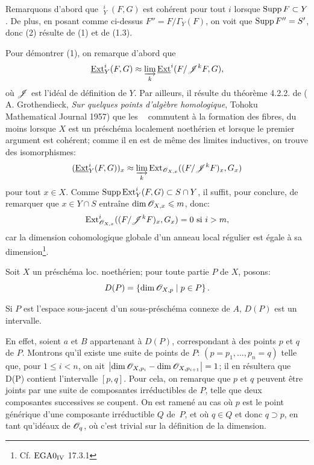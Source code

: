 Remarquons d'abord que $\mathop{\underline{\mathrm{Ext}}}\nolimits^i_Y (F, G)$ est coh\'erent pour tout $i$ lorsque $\operatorname{Supp} F \subset Y$. De plus, en posant comme ci-dessus $F'' = F/\Gamma_Y(F)$, on voit que $\operatorname{Supp} F'' = S'$, donc (2) r\'esulte de (1) et de (1.3).

Pour d\'emontrer (1), on remarque d'abord que
\[
\mathop{\underline{\mathrm{Ext}}}\nolimits^i_Y (F, G) \approx \varinjlim_{k} \mathop{\underline{\mathrm{Ext}}}\nolimits^i (F/{\mathscr J}^k F, G),
\]
o\`u ${\mathscr J}$ est l'id\'eal de d\'efinition de $Y$. Par ailleurs, il
r\'esulte du th\'eor\`eme 4.2.2. de ( A. Grothendieck,
\textit{Sur quelques points d'algèbre homologique}, Tohoku
Mathematical Journal 1957) que les $\mathop{\underline{\mathrm{Ext}}}\nolimits$ commutent \`a
la formation des fibres, du moins lorsque $X$ est un pr\'esch\'ema
localement noeth\'erien et lorsque le premier argument est coh\'erent;
comme il en est de m\^eme des limites inductives, on trouve des
isomorphismes:
\[
(\mathop{\underline{\mathrm{Ext}}}\nolimits^i_Y (F, G))_x \approx \varinjlim_{k} \operatorname{Ext}_{{\mathscr O}_{X, x}} ((F/{\mathscr J}^k F)_x, G_x)
\]
pour tout $x \in X$. Comme $\operatorname{Supp} \operatorname{Ext}^i_Y (F, G) \subset S \cap Y$, il suffit, pour conclure, de remarquer que $x \in Y \cap S$ entra\^ine $\dim {\mathscr O}_{X, x} \leqslant m$, donc:
\[
\operatorname{Ext}^i_{{\mathscr O}_{X, x}} ((F/{\mathscr J}^k F)_x, G_x) = 0 \text { si } i > m,
\]
car la dimension cohomologique globale d'un anneau local r\'egulier est \'egale \`a sa dimension\footnote{Cf. $\textup{EGA}\space 0_{\textup{IV}}$ 17.3.1}.

Soit $X$ un pr\'esch\'ema loc. noeth\'erien; pour toute partie $P$ de $X$, posons:
\[
D(P) = \left\{ \dim {\mathscr O}_{X, p} \mid p \in P \right\}.
\]

\begin{lemme}\label{VII.2.2}
Si $P$ est l'espace sous-jacent d'un sous-pr\'esch\'ema connexe de $A$, $D(P)$ est un intervalle.
\end{lemme}

En effet, soient $a$ et $B$ appartenant \`a $D(P)$, correspondant \`a des points $p$ et $q$ de $P$. Montrons qu'il existe une suite de points de $P$: $(p = p_1, \dots, p_n = q)$ telle que, pour $1 \leq i < n $, on ait $\left| \dim {\mathscr O}_{X, p_i} - \dim {\mathscr O}_{X, p_{i+1}} \right| = 1$; il en r\'esultera que D(P) contient l'intervalle $[p, q]$. Pour cela, on remarque que $p$ et $q$ peuvent \^etre joints par une suite de composantes irr\'eductibles de $P$, telle que deux composantes successives se coupent. On est ramen\'e au cas o\`u $p$ est le point g\'en\'erique d'une composante irr\'eductible $Q$ de~$P$, et o\`u $q \in Q$ et donc $q \supset p$, en tant qu'id\'eaux de ${\mathscr O}_q$, o\`u c'est trivial sur la d\'efinition de la dimension.

